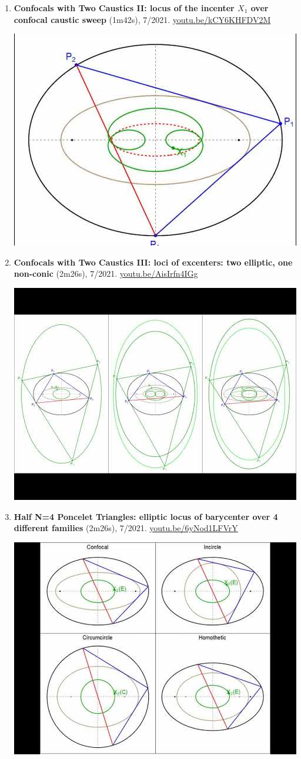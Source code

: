 \documentclass[12pt]{article}
\begin{document}
\begin{enumerate}[resume]
% 
\item \textbf{Confocals with Two Caustics II: locus of the incenter $X_{1}$ over confocal caustic sweep} (1m42s), 7/2021. \href{https://youtu.be/kCY6KHFDV2M}{\url{youtu.be/kCY6KHFDV2M}}
\begin{center}\includegraphics[width=.5\textwidth]{pics/kCY6KHFDV2M.jpg}\end{center}
% 
\item \textbf{Confocals with Two Caustics III: loci of excenters: two elliptic, one non-conic} (2m26s), 7/2021. \href{https://youtu.be/AisIrfn4IGg}{\url{youtu.be/AisIrfn4IGg}}
\begin{center}\includegraphics[width=.5\textwidth]{pics/AisIrfn4IGg.jpg}\end{center}
% 
\item \textbf{Half N=4 Poncelet Triangles: elliptic locus of barycenter over 4 different families} (2m26s), 7/2021. \href{https://youtu.be/6yNod1LFVrY}{\url{youtu.be/6yNod1LFVrY}}
\begin{center}\includegraphics[width=.5\textwidth]{pics/6yNod1LFVrY.jpg}\end{center}

\end{enumerate}
\end{document}
